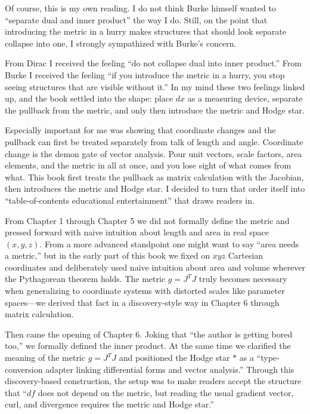 \documentclass[a4paper,12pt,openany]{book}
\begin{document}
Of course, this is my own reading. I do not think Burke himself wanted
to ``separate dual and inner product'' the way I do. Still, on the point
that introducing the metric in a hurry makes structures that should look
separate collapse into one, I strongly sympathized with Burke's concern.

From Dirac I received the feeling ``do not collapse dual into inner
product.'' From Burke I received the feeling ``if you introduce the
metric in a hurry, you stop seeing structures that are visible without
it.'' In my mind these two feelings linked up, and the book settled into
the shape: place \(dx\) as a measuring device, separate the pullback
from the metric, and only then introduce the metric and Hodge star.

Especially important for me was showing that coordinate changes and the
pullback can first be treated separately from talk of length and angle.
Coordinate change is the demon gate of vector analysis. Pour unit
vectors, scale factors, area elements, and the metric in all at once,
and you lose sight of what comes from what. This book first treats the
pullback as matrix calculation with the Jacobian, then introduces the
metric and Hodge star. I decided to turn that order itself into
``table-of-contents educational entertainment'' that draws readers in.

From Chapter 1 through Chapter 5 we did not formally define the metric
and pressed forward with naive intuition about length and area in real
space \((x,y,z)\). From a more advanced standpoint one might want to say
``area needs a metric,'' but in the early part of this book we fixed on
\(xyz\) Cartesian coordinates and deliberately used naive intuition
about area and volume wherever the Pythagorean theorem holds. The metric
\(g = J^T J\) truly becomes necessary when generalizing to coordinate
systems with distorted scales like parameter spaces—we derived that
fact in a discovery-style way in Chapter 6 through matrix calculation.

Then came the opening of Chapter 6. Joking that ``the author is getting
bored too,'' we formally defined the inner product. At the same time we
clarified the meaning of the metric \(g = J^T J\) and positioned the
Hodge star \(\ast\) as a ``type-conversion adapter linking differential
forms and vector analysis.'' Through this discovery-based construction,
the setup was to make readers accept the structure that ``\(df\) does
not depend on the metric, but reading the usual gradient vector, curl,
and divergence requires the metric and Hodge star.''
\end{document}
